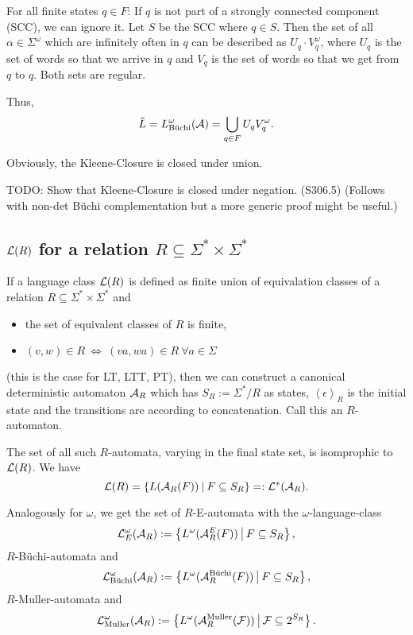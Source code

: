 For all finite states $q \in F$: If $q$ is not part of a strongly connected component (SCC), we can ignore it. Let $S$ be the SCC where $q \in S$. Then the set of all $\alpha \in \Sigma^\omega$ which are infinitely often in $q$ can be described as $U_q \cdot V_q^\omega$, where $U_q$ is the set of words so that we arrive in $q$ and $V_q$ is the set of words so that we get from $q$ to $q$. Both sets are regular.

Thus,
\[ \tilde L = L^\omega_{\text{Büchi}}(\mathcal{A}) = \bigcup_{q \in F} U_q V_q^\omega . \]

Obviously, the Kleene-Closure is closed under union.

TODO: Show that Kleene-Closure is closed under negation. (S306.5) (Follows with non-det Büchi complementation but a more generic proof might be useful.)

\subsection{$\mathcal{L}(R)$ for a relation $R\subseteq\Sigma^* \times \Sigma^*$}
\label{gen:R-automata}

If a language class $\mathcal{L}(R)$ is defined as finite union of equivalation classes of a relation $R \subseteq \Sigma^* \times \Sigma^*$ and
\begin{itemize}
\item the set of equivalent classes of $R$ is finite,
\item $(v,w) \in R \ \Leftrightarrow \ (va,wa) \in R \ \forall a \in \Sigma$
\end{itemize}
(this is the case for LT, LTT, PT),
then we can construct a canonical deterministic automaton $\mathcal{A}_R$ which has $S_R := \Sigma^* / R$ as states, $\left<\epsilon\right>_R$ is the initial state and the transitions are according to concatenation. Call this an $R$-automaton.

The set of all such $R$-automata, varying in the final state set, is isomprophic to $\mathcal{L}(R)$. We have
\[ \Lang(R) = \Set{L(\A_R(F))}{F \subseteq S_R} =: \Lang^*(\A_R) . \]

Analogously for $\omega$, we get the set of $R$-E-automata with the $\omega$-language-class
\[ \Lang^\omega_E(\A_R) := \Set{L^\omega(\A^E_R(F))}{F \subseteq S_R} , \]
$R$-Büchi-automata and
\[ \Lang^\omega_{\text{Büchi}} (\A_R) := \Set{L^\omega(\A_R^{\text{Büchi}}(F))}{F \subseteq S_R} , \]
$R$-Muller-automata and
\[ \Lang^\omega_{\text{Muller}} (\A_R) := \Set{L^\omega(\A_R^{\text{Muller}}(\F))}{\F \subseteq 2^{S_R}} . \]

